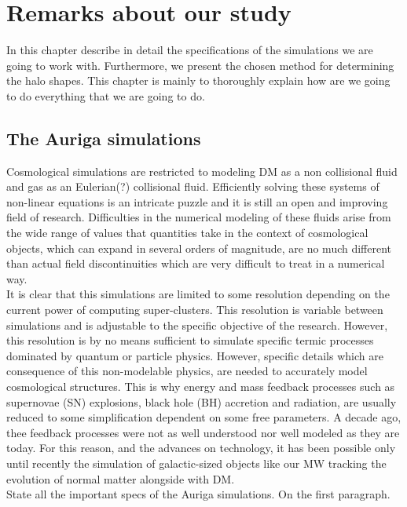 \chapter{Remarks about our study}
In this chapter describe in detail the specifications of the simulations we are going to work with. Furthermore, we present the chosen method for determining the halo shapes. This chapter is mainly to thoroughly explain how are we going to do everything that we are going to do.\\

\section{The Auriga simulations}
Cosmological simulations are restricted to modeling DM as a non collisional fluid and gas as an Eulerian(?) collisional fluid. Efficiently solving these systems of non-linear equations is an intricate puzzle and it is still an open and improving field of research. 
Difficulties in the numerical modeling of these fluids arise from the wide range of values that quantities take in the context of cosmological objects, which can expand in several orders of magnitude, are no much different than actual field discontinuities which are very difficult to treat in a numerical way.\\

It is clear that this simulations are limited to some resolution depending on the current power of computing super-clusters. This resolution is variable between simulations and is adjustable to the specific objective of the research. However, this resolution is by no means sufficient to simulate specific termic processes dominated by quantum or particle physics. However, specific details which are consequence of this non-modelable physics, are needed to accurately model cosmological structures. This is why energy and mass feedback processes such as supernovae (SN) explosions, black hole (BH) accretion and radiation, are usually reduced to some simplification dependent on some free parameters. A decade ago, thee feedback processes were not as well understood nor well modeled as they are today. For this reason, and the advances on technology, it has been possible only until recently the simulation of galactic-sized objects like our MW tracking the evolution of normal matter alongside with DM.\\


State all the important specs of the Auriga simulations. On the first paragraph.\\

